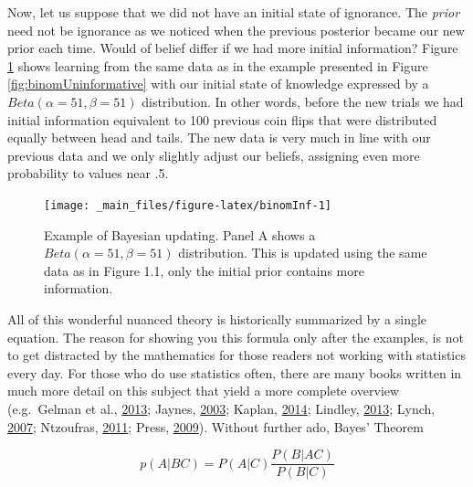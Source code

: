 \documentclass[openright,titlepage,12pt,a4paper]{book}
\begin{document}
Now, let us suppose that we did not have an initial state of ignorance. The \emph{prior} need not be ignorance as we noticed when the previous posterior became our new prior each time. Would of belief differ if we had more initial information? Figure \ref{fig:binomInf} shows learning from the same data as in the example presented in Figure \ref{fig:binomUninformative} with our initial state of knowledge expressed by a \(Beta(\alpha = 51, \beta = 51)\) distribution. In other words, before the new trials we had initial information equivalent to 100 previous coin flips that were distributed equally between head and tails. The new data is very much in line with our previous data and we only slightly adjust our beliefs, assigning even more probability to values near .5.

\begin{figure}

{\centering \texttt{[image: \_main\_files/figure-latex/binomInf-1]} 

}

\caption{Example of Bayesian updating. Panel A shows a $Beta(\alpha = 51, \beta = 51)$ distribution. This is updated using the same data as in Figure 1.1, only the initial prior contains more information.}\label{fig:binomInf}
\end{figure}

All of this wonderful nuanced theory is historically summarized by a single equation. The reason for showing you this formula only after the examples, is not to get distracted by the mathematics for those readers not working with statistics every day. For those who do use statistics often, there are many books written in much more detail on this subject that yield a more complete overview (e.g.~Gelman et al., \protect\hyperlink{ref-gelman_bayesian_2013}{2013}; Jaynes, \protect\hyperlink{ref-jaynes_probability_2003}{2003}; Kaplan, \protect\hyperlink{ref-kaplan_bayesian_2014}{2014}; Lindley, \protect\hyperlink{ref-lindley_understanding_2013}{2013}; Lynch, \protect\hyperlink{ref-lynch_introduction_2007}{2007}; Ntzoufras, \protect\hyperlink{ref-ntzoufras_bayesian_2011}{2011}; Press, \protect\hyperlink{ref-press_subjective_2009}{2009}). Without further ado, Bayes' Theorem

\begin{equation} 
p(A|BC) = P(A|C)\frac{P(B|AC)}{P(B|C)}
\label{eq:bayestheorem}
\end{equation}
\end{document}
